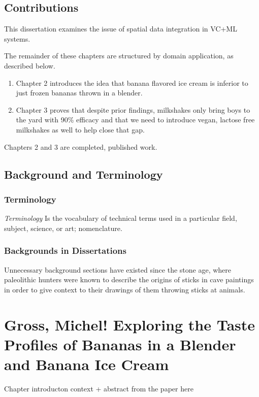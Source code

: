 \documentclass[oneside,openany]{report}
\let\Oldsection\section
\renewcommand{\section}{\FloatBarrier\Oldsection}
\let\Oldsubsection\subsection
\renewcommand{\subsection}{\FloatBarrier\Oldsubsection}
\begin{document}
\section{Contributions}
This dissertation examines the issue of spatial data integration in VC+ML systems. 

\noindent The remainder of these chapters are structured by domain application, as described below. 

\begin{enumerate}
    \item Chapter 2 introduces the idea that banana flavored ice cream is inferior to just frozen bananas thrown in a blender.
    \item Chapter 3 proves that despite prior findings, milkshakes only bring boys to the yard with 90\% efficacy and that we need to introduce vegan, lactose free milkshakes as well to help close that gap.
\end{enumerate}

Chapters 2 and 3 are completed, published work.

\section{Background and Terminology}

\subsection{Terminology}
\textit{Terminology} Is the vocabulary of technical terms used in a particular field, subject, science, or art; nomenclature.

\subsection{Backgrounds in Dissertations}
Unnecessary background sections have existed since the stone age, where paleolithic hunters were known to describe the origins of sticks in cave paintings in order to give context to their drawings of them throwing sticks at animals.

\chapter{Gross, Michel! Exploring the Taste Profiles of Bananas in a Blender and Banana Ice Cream}
Chapter introducton context + abstract from the paper here
\end{document}
